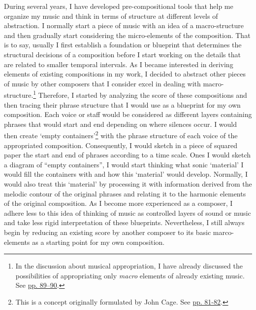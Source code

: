 During several years, I have developed pre-compositional tools that help me organize my music and think in terms of structure at different levels of abstraction. I normally start a piece of music with an idea of a macro-structure and then gradually start considering the micro-elements of the composition. That is to say, usually I first establish a foundation or blueprint that determines the structural decisions of a composition before I start working on the details that are related to smaller temporal intervals. As I became interested in deriving elements of existing compositions in my work, I decided to abstract other pieces of music by other composers that I consider excel in dealing with macro-structure.\footnote{In the discussion about musical appropriation, I have already discussed the possibilities of appropriating only \emph{macro} elements of already existing music. See \hyperlink{macroplunder}{pp. 89--90}.} Therefore, I started by analyzing the score of these compositions and then tracing their phrase structure that I would use as a blueprint for my own composition. Each voice or staff would be considered as different layers containing phrases that would start and end depending on where silences occur. I would then create `empty containers'\footnote{This is a concept originally formulated by John Cage. See \hyperlink{landscape5}{pp. 81-82}.} with the phrase structure of each voice of the appropriated composition. Consequently, I would sketch in a piece of squared paper the start and end of phrases according to a time scale. Ones I would sketch a diagram of ``empty containers'', I would start thinking what sonic `material' I would fill the containers with and how this `material' would develop. Normally, I would also treat this `material' by processing it with information derived from the melodic contour of the original phrases and relating it to the harmonic elements of the original composition. As I become more experienced as a composer, I adhere less to this idea of thinking of music as controlled layers of sound or music and take less rigid interpretation of these blueprints. Nevertheless, I still always begin by reducing an existing score by another composer to its basic marco-elements as a starting point for my own composition. 

